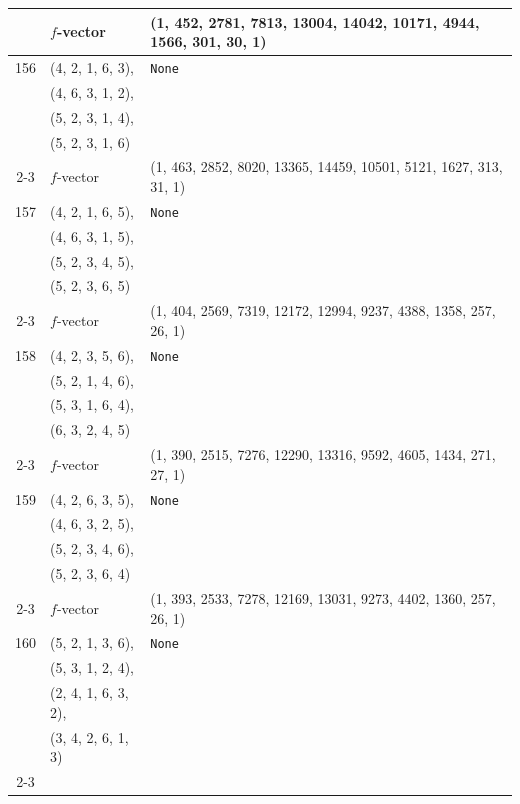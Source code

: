 \documentclass[10pt]{amsart}
\numberwithin{equation}{section}
\theoremstyle{plain}
\theoremstyle{definition}
\theoremstyle{remark}
\begin{document}
{\begin{longtable}{c|l|l}
		& $f$-vector & {(1, 452, 2781, 7813, 13004, 14042, 10171, 4944, 1566, 301, 30, 1)} \\
		\midrule
		
		156 & (4, 2, 1, 6, 3), & \texttt{None} \\
		& (4, 6, 3, 1, 2), &  \\
		& (5, 2, 3, 1, 4), &  \\
		& (5, 2, 3, 1, 6) &  \\ \cline{2-3}
		
		& $f$-vector & {(1, 463, 2852, 8020, 13365, 14459, 10501, 5121, 1627, 313, 31, 1)} \\
		\midrule
		
		157 & (4, 2, 1, 6, 5), & \texttt{None} \\
		& (4, 6, 3, 1, 5), &  \\
		& (5, 2, 3, 4, 5), &  \\
		& (5, 2, 3, 6, 5) &  \\ \cline{2-3}
		
		& $f$-vector & {(1, 404, 2569, 7319, 12172, 12994, 9237, 4388, 1358, 257, 26, 1)} \\
		\midrule
		
		158 & (4, 2, 3, 5, 6), & \texttt{None} \\
		& (5, 2, 1, 4, 6), &  \\
		& (5, 3, 1, 6, 4), &  \\
		& (6, 3, 2, 4, 5) &  \\ \cline{2-3}
		
		& $f$-vector & {(1, 390, 2515, 7276, 12290, 13316, 9592, 4605, 1434, 271, 27, 1)} \\
		\midrule
		
		159 & (4, 2, 6, 3, 5), & \texttt{None} \\
		& (4, 6, 3, 2, 5), &  \\
		& (5, 2, 3, 4, 6), &  \\
		& (5, 2, 3, 6, 4) &  \\ \cline{2-3}
		
		& $f$-vector & {(1, 393, 2533, 7278, 12169, 13031, 9273, 4402, 1360, 257, 26, 1)} \\
		\midrule
		
		160 & (5, 2, 1, 3, 6), & \texttt{None} \\
		& (5, 3, 1, 2, 4), &  \\
		& (2, 4, 1, 6, 3, 2), &  \\
		& (3, 4, 2, 6, 1, 3) &  \\ \cline{2-3}
		

\end{longtable}}
\end{document}
